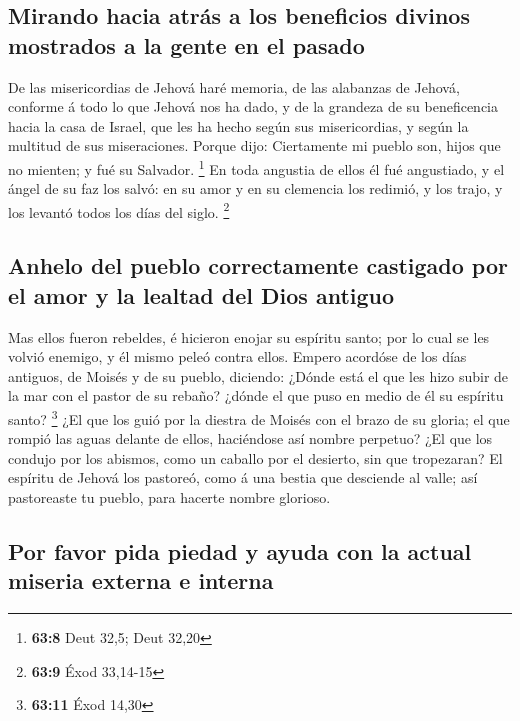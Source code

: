 \hypertarget{mirando-hacia-atruxe1s-a-los-beneficios-divinos-mostrados-a-la-gente-en-el-pasado}{%
\subsection{Mirando hacia atrás a los beneficios divinos mostrados a la
gente en el
pasado}\label{mirando-hacia-atruxe1s-a-los-beneficios-divinos-mostrados-a-la-gente-en-el-pasado}}

 De las misericordias de Jehová haré memoria, de las
alabanzas de Jehová, conforme á todo lo que Jehová nos ha dado, y de la
grandeza de su beneficencia hacia la casa de Israel, que les ha hecho
según sus misericordias, y según la multitud de sus miseraciones.
 Porque dijo: Ciertamente mi pueblo son, hijos que no
mienten; y fué su Salvador. \footnote{\textbf{63:8} Deut 32,5; Deut
  32,20}  En toda angustia de ellos él fué angustiado, y
el ángel de su faz los salvó: en su amor y en su clemencia los redimió,
y los trajo, y los levantó todos los días del siglo. \footnote{\textbf{63:9}
  Éxod 33,14-15}

\hypertarget{anhelo-del-pueblo-correctamente-castigado-por-el-amor-y-la-lealtad-del-dios-antiguo}{%
\subsection{Anhelo del pueblo correctamente castigado por el amor y la
lealtad del Dios
antiguo}\label{anhelo-del-pueblo-correctamente-castigado-por-el-amor-y-la-lealtad-del-dios-antiguo}}

 Mas ellos fueron rebeldes, é hicieron enojar su espíritu
santo; por lo cual se les volvió enemigo, y él mismo peleó contra ellos.
 Empero acordóse de los días antiguos, de Moisés y de su
pueblo, diciendo: ¿Dónde está el que les hizo subir de la mar con el
pastor de su rebaño? ¿dónde el que puso en medio de él su espíritu
santo? \footnote{\textbf{63:11} Éxod 14,30}  ¿El que los
guió por la diestra de Moisés con el brazo de su gloria; el que rompió
las aguas delante de ellos, haciéndose así nombre perpetuo?
 ¿El que los condujo por los abismos, como un caballo por
el desierto, sin que tropezaran?  El espíritu de Jehová
los pastoreó, como á una bestia que desciende al valle; así pastoreaste
tu pueblo, para hacerte nombre glorioso.

\hypertarget{por-favor-pida-piedad-y-ayuda-con-la-actual-miseria-externa-e-interna}{%
\subsection{Por favor pida piedad y ayuda con la actual miseria externa
e
interna}\label{por-favor-pida-piedad-y-ayuda-con-la-actual-miseria-externa-e-interna}}

